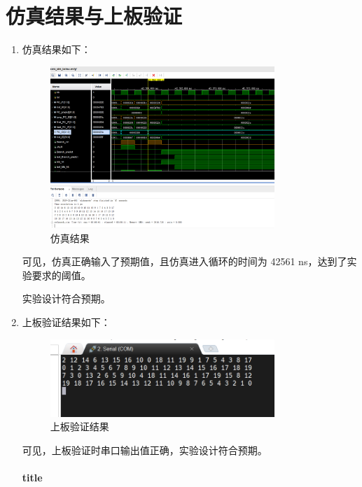 \documentclass{article}
\begin{document}
\newpage
\section{仿真结果与上板验证}
    \begin{enumerate}
        \item 仿真结果如下：\par
        \begin{figure}[h]
            \centering
            \includegraphics[width=0.8\textwidth]{image/sim.png}
            \caption{仿真结果}
        \end{figure}
        可见，仿真正确输入了预期值，且仿真进入循环的时间为 42561 ns，达到了实验要求的阈值。\par
        实验设计符合预期。\par

        \item 上板验证结果如下：\par
        \begin{figure}[h]
            \centering
            \includegraphics[width=0.8\textwidth]{image/board.png}
            \caption{上板验证结果}
        \end{figure}
        可见，上板验证时串口输出值正确，实验设计符合预期。\paragraph[short]{title}

    \end{enumerate}
\end{document}
